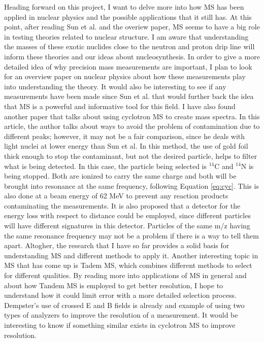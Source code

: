 \documentclass[12pt]{amsart}
\begin{document}
Heading forward on this project, I want to delve more into how MS has been applied in nuclear physics and the possible applications that it still has. At this point, after reading Sun et al. and the overiew paper, MS seems to have a big role in testing theories related to nuclear structure. I am aware that understanding the masses of these exotic nuclides close to the neutron and proton drip line will inform these theories and our ideas about nucleosynthesis. In order to give a more detailed idea of why precision mass measurements are important, I plan to look for an overview paper on nuclear physics about how these measurements play into understanding the theory. It would also be interesting to see if any measurements have been made since Sun et al. that would further back the idea that MS is a powerful and informative tool for this field. I have also found another paper that talks about using cyclotron MS to create mass spectra. In this article, the author talks about ways to avoid the problem of contamination due to different peaks; however, it may not be a fair comparison, since he deals with light nuclei at lower energy than Sun et al. In this method, the use of gold foil thick enough to stop the contaminant, but not the desired particle, helps to filter what is being detected. In this case, the particle being selected is $^{14}$C and $^{14}$N is being stopped. Both are ionized to carry the same charge and both will be brought into resonance at the same frequency, following Equation \eqref{eq:cyc}. This is also done at a beam energy of 62 MeV to prevent any reaction products contaminating the measurements. It is also proposed that a detector for the energy loss with respect to distance could be employed, since different particles will have different signatures in this detector. Particles of the same m/z having the same resonance frequency may not be a problem if there is a way to tell them apart.\cite{dating} Altogher, the research that I have so far provides a solid basis for understanding MS and different methods to apply it. Another interesting topic in MS that has come up is Tadem MS, which combines different methods to select for different qualities. By reading more into applications of MS in general and about how Tandem MS is employed to get better resolution, I hope to understand how it could limit error with a more detailed selection process. Dempster's use of crossed E and B fields is already and example of using two types of analyzers to improve the resolution of a measurement. It would be interesting to know if something similar exists in cyclotron MS to improve resolution.\\
\end{document}
